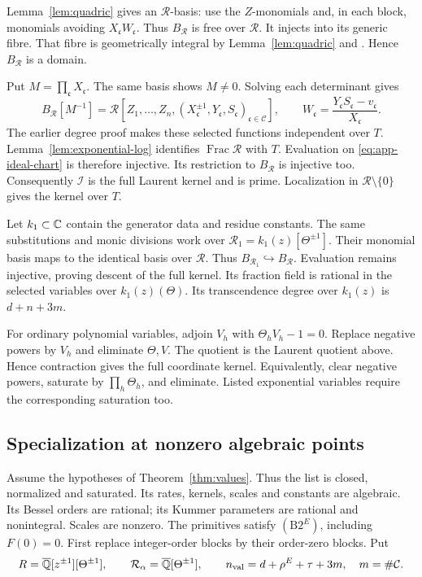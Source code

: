Lemma~\ref{lem:quadric} gives an $\mathcal R$-basis: use the $Z$-monomials
and, in each block, monomials avoiding $X_{\mathfrak c}W_{\mathfrak c}$.
Thus $B_{\mathcal R}$ is free over $\mathcal R$. It injects into its generic fibre.
That fibre is geometrically integral by Lemma~\ref{lem:quadric}
and \cite[Proposition~(4.6.5)(ii), p.~69]{EGAIV2}.
Hence $B_{\mathcal R}$ is a domain.

Put $M=\prod_{\mathfrak c}X_{\mathfrak c}$.
The same basis shows $M\ne0$. Solving each determinant gives
\begin{equation}\label{eq:app-ideal-chart}
 B_{\mathcal R}[M^{-1}]
 =\mathcal R[Z_1,\ldots,Z_n,
      (X_{\mathfrak c}^{\pm1},Y_{\mathfrak c},S_{\mathfrak c})_
        {\mathfrak c\in\mathcal C}],
 \qquad
 W_{\mathfrak c}=\frac{Y_{\mathfrak c}S_{\mathfrak c}-v_{\mathfrak c}}
 {X_{\mathfrak c}}.
\end{equation}
The earlier degree proof makes these selected functions independent over
$T$. Lemma~\ref{lem:exponential-log} identifies
$\operatorname{Frac}\mathcal R$ with $T$.
Evaluation on \eqref{eq:app-ideal-chart} is therefore injective.
Its restriction to $B_{\mathcal R}$ is injective too.
Consequently $\mathcal I$ is the full Laurent kernel and is prime.
Localization in $\mathcal R\setminus\{0\}$ gives the kernel over $T$.

Let $k_1\subset\mathbb{C}$ contain the generator data and residue constants.
The same substitutions and monic divisions work over
$\mathcal R_1=k_1(z)[\Theta^{\pm1}]$.
Their monomial basis maps to the identical basis over $\mathcal R$.
Thus $B_{\mathcal R_1}\hookrightarrow B_{\mathcal R}$.
Evaluation remains injective, proving descent of the full kernel.
Its fraction field is rational in the selected variables over
$k_1(z)(\Theta)$. Its transcendence degree over $k_1(z)$ is $d+n+3m$.

For ordinary polynomial variables, adjoin $V_h$ with
$\Theta_hV_h-1=0$. Replace negative powers by $V_h$ and eliminate
$\Theta,V$. The quotient is the Laurent quotient above.
Hence contraction gives the full coordinate kernel.
Equivalently, clear negative powers, saturate by
$\prod_h\Theta_h$, and eliminate.
Listed exponential variables require the corresponding saturation too.

\subsection{Specialization at nonzero algebraic points}
\label{app:specialization-details}
Assume the hypotheses of Theorem~\ref{thm:values}.
Thus the list is closed, normalized and saturated.
Its rates, kernels, scales and constants are algebraic.
Its Bessel orders are rational; its Kummer parameters are rational
and nonintegral. Scales are nonzero.
The primitives satisfy $(\mathrm{B2}^E)$, including $F(0)=0$.
First replace integer-order blocks by their order-zero blocks.
Put
\[
 R={\overline{\mathbb{Q}}}[z^{\pm1}][\Theta^{\pm1}],\qquad
 \mathcal R_\alpha={\overline{\mathbb{Q}}}[\Theta^{\pm1}],\qquad
 n_{\mathrm{val}}=d+\rho^E+\tau+3m,\quad m=\#\mathcal C.
\]

